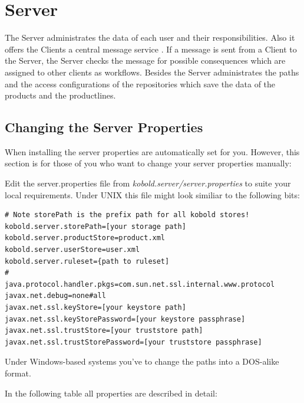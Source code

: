 \section{Server}

The Server administrates the data of each user and their responsibilities. Also it
offers the Clients a central message service . If a message is sent from a Client
to the Server, the Server checks the message for possible consequences which are
assigned to other clients as workflows. Besides the Server administrates the paths
and the access configurations of the repositories which save the data of the products
and the productlines.

\subsection{Changing the Server Properties}
When installing the server properties are automatically set for you. However, this section is for those
of you who want to change your server properties manually:

Edit the server.properties
file from {\it kobold.server/server.properties} to suite your local
requirements. Under UNIX this file might look similiar to the following
bits:

\begin{verbatim}
# Note storePath is the prefix path for all kobold stores!
kobold.server.storePath=[your storage path]
kobold.server.productStore=product.xml
kobold.server.userStore=user.xml
kobold.server.ruleset={path to ruleset]
#
java.protocol.handler.pkgs=com.sun.net.ssl.internal.www.protocol
javax.net.debug=none#all
javax.net.ssl.keyStore=[your keystore path]
javax.net.ssl.keyStorePassword=[your keystore passphrase]
javax.net.ssl.trustStore=[your truststore path]
javax.net.ssl.trustStorePassword=[your truststore passphrase]
\end{verbatim}

Under Windows-based systems you've to change the paths into a
DOS-alike format.

In the following table all properties are described in detail:

